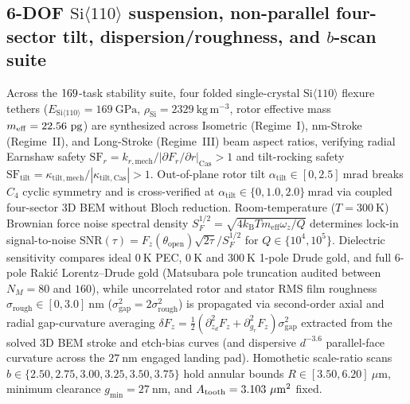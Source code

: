\documentclass[pdflatex,sn-nature]{sn-jnl}
\begin{document}
\subsection*{6-DOF $\mathrm{Si}\langle 110\rangle$ suspension, non-parallel four-sector tilt, dispersion/roughness, and $b$-scan suite}
Across the $169{}$-task stability suite, four folded single-crystal $\mathrm{Si}\langle 110\rangle$ flexure tethers ($E_{\mathrm{Si}\langle 110\rangle} = 169\ \mathrm{GPa}$, $\rho_{\mathrm{Si}} = 2329\ \mathrm{kg\,m^{-3}}$, rotor effective mass $m_{\mathrm{eff}} = 22.56{}\ \mathrm{pg}$) are synthesized across Isometric (Regime~I), nm-Stroke (Regime~II), and Long-Stroke (Regime~III) beam aspect ratios, verifying radial Earnshaw safety $\mathrm{SF}_r = k_{r,\mathrm{mech}} / |\partial F_r/\partial r|_{\mathrm{Cas}} > 1$ and tilt-rocking safety $\mathrm{SF}_{\mathrm{tilt}} = \kappa_{\mathrm{tilt,mech}} / |\kappa_{\mathrm{tilt,Cas}}| > 1$. Out-of-plane rotor tilt $\alpha_{\mathrm{tilt}} \in [0, 2.5]\ \mathrm{mrad}$ breaks $C_4$ cyclic symmetry and is cross-verified at $\alpha_{\mathrm{tilt}} \in \{0, 1.0, 2.0\}\ \mathrm{mrad}$ via coupled four-sector 3D BEM without Bloch reduction. Room-temperature ($T = 300\ \mathrm{K}$) Brownian force noise spectral density $S_F^{1/2} = \sqrt{4 k_{\mathrm{B}} T m_{\mathrm{eff}} \omega_z / Q}$ determines lock-in signal-to-noise $\mathrm{SNR}(\tau) = F_z(\theta_{\mathrm{open}})\sqrt{2\tau} / S_F^{1/2}$ for $Q \in \{10^4, 10^5\}$. Dielectric sensitivity compares ideal $0\ \mathrm{K}$ PEC, $0\ \mathrm{K}$ and $300\ \mathrm{K}$ 1-pole Drude gold, and full 6-pole Raki\'c Lorentz--Drude gold\cite{rakic1998} (Matsubara pole truncation audited between $N_M = 80$ and $160$), while uncorrelated rotor and stator RMS film roughness $\sigma_{\mathrm{rough}} \in [0, 3.0]\ \mathrm{nm}$ ($\sigma_{\mathrm{gap}}^2 = 2\sigma_{\mathrm{rough}}^2$) is propagated via second-order axial and radial gap-curvature averaging $\delta F_z = \frac{1}{2}(\partial_{z_d}^2 F_z + \partial_{g_r}^2 F_z)\sigma_{\mathrm{gap}}^2$ extracted from the solved 3D BEM stroke and etch-bias curves (and dispersive $d^{-3.6}$ parallel-face curvature across the $27\ \mathrm{nm}$ engaged landing pad). Homothetic scale-ratio scans $b \in \{2.50, 2.75, 3.00, 3.25, 3.50, 3.75\}$ hold annular bounds $R \in [3.50, 6.20]\ \mu\mathrm{m}$, minimum clearance $g_{\min} = 27\ \mathrm{nm}$, and $A_{\mathrm{tooth}} = 3.103{}\ \mu\mathrm{m}^2$ fixed.
\end{document}
